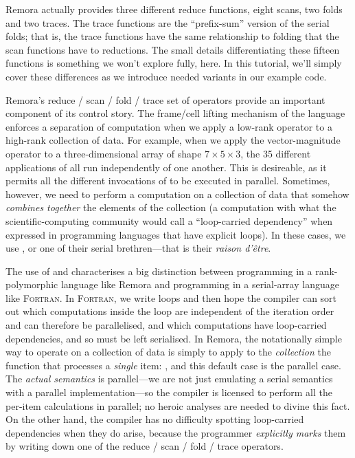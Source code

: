Remora actually provides three different reduce functions,
eight scans, two folds and two traces.
The trace functions are the ``prefix-sum'' version of the
serial folds;
that is, the trace functions have the same relationship to folding
that the scan functions have to reductions.
The small details differentiating these fifteen functions is
something we won't explore fully, here.
In this tutorial, we'll simply cover these differences as we introduce
needed variants in our example code.

Remora's reduce / scan / fold / trace set of operators provide an important component
of its control story.
The frame/cell lifting mechanism of the language enforces a separation of
computation when we apply a low-rank operator to a high-rank collection of
data.
For example, when we apply the vector-magnitude operator  to a
three-dimensional array of shape $7 \times 5 \times 3$,
the 35 different applications of 
all run independently of one another.
This is desireable,
as it permits all the different invocations of 
to be executed in parallel.
Sometimes, however, we need to perform a computation on a collection of data
that somehow \emph{combines together} the elements of the collection
(a computation with what the scientific-computing community would call
a ``loop-carried dependency'' when expressed in programming languages
that have explicit loops).
In these cases, we use ,  or one of their serial
brethren---that is their \emph{raison d'\^etre}.

The use of  and  characterises a big distinction between
programming in a rank-polymorphic language like Remora and
programming in a serial-array language like \textsc{Fortran}.
In \textsc{Fortran},
we write loops and then hope the compiler can sort out which
computations inside the loop are independent of the iteration order and
can therefore be parallelised,
and which computations have loop-carried dependencies,
and so must be left serialised.
In Remora, the notationally simple way to operate on a collection of data
is simply to apply to the \emph{collection} 
the function that processes a \emph{single} item: ,
and this default case is the parallel case.
The \emph{actual semantics} is parallel---we are not just emulating
a serial semantics with a parallel implementation---so the compiler is
licensed to perform all the per-item calculations in parallel;
no heroic analyses are needed to divine this fact.
On the other hand,
the compiler has no difficulty spotting loop-carried dependencies
when they do arise,
because the programmer \emph{explicitly marks} them by writing
down one of the reduce / scan / fold / trace operators.

